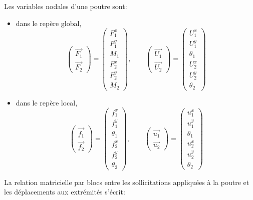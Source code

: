 \documentclass[a4paper]{article}
\begin{document}
 Les variables nodales d'une poutre sont:
\begin{itemize}
\item dans le repère global,
\[\left(\begin{array}{l} 
\vec{F_{1}}\\\vec{F_{2}}
\end{array}\right) =\left(\begin{array}{l} 
F_{1}^x\\F_{1}^y\\ M_1\\F_{2}^x\\F_{2}^y\\ M_2
\end{array}\right) ,\qquad \left(\begin{array}{l} 
\vec{U_{1}}\\\vec{U_{2}}
\end{array}\right) =\left(\begin{array}{l} 
U_{1}^x\\U_{1}^y\\\theta_1\\U_{2}^x\\U_{2}^y\\\theta_2
\end{array}\right)  \]
\item dans le repère local,
\[\left(\begin{array}{l} 
\vec{f_{1}}\\\vec{f_{2}}
\end{array}\right) =\left(\begin{array}{l} 
f_{1}^x\\f_{1}^y\\\theta_1\\f_{2}^x\\f_{2}^y\\\theta_2
\end{array}\right) ,\qquad \left(\begin{array}{l} 
\vec{u_{1}}\\\vec{u_{2}}
\end{array}\right) =\left(\begin{array}{l} 
u_{1}^x\\u_{1}^y\\\theta_1\\u_{2}^x\\u_{2}^y\\\theta_2
\end{array}\right)  \]
\end{itemize}
La relation matricielle par blocs entre les sollicitations appliquées à la poutre et les déplacements aux extrémités s'écrit:
\end{document}
